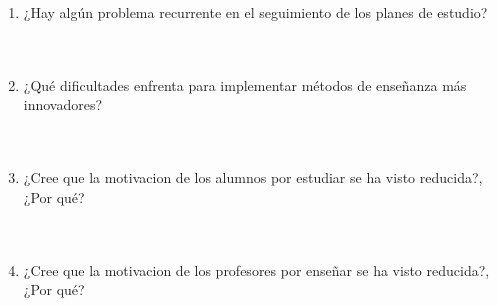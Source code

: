 \documentclass{article}
\begin{document}
\begin{enumerate}
        \underline{\hspace{0.95\linewidth}} \vspace{0.3cm} \\
        \underline{\hspace{0.95\linewidth}} \vspace{0.3cm}
    \item ¿Hay algún problema recurrente en el seguimiento de los planes de estudio? \\[0.5cm]
        \underline{\hspace{0.95\linewidth}} \vspace{0.3cm} \\
        \underline{\hspace{0.95\linewidth}} \vspace{0.3cm} \\
        \underline{\hspace{0.95\linewidth}} \vspace{0.3cm}
    \item ¿Qué dificultades enfrenta para implementar métodos de enseñanza más innovadores? \\[0.5cm]
        \underline{\hspace{0.95\linewidth}} \vspace{0.3cm} \\
        \underline{\hspace{0.95\linewidth}} \vspace{0.3cm} \\
        \underline{\hspace{0.95\linewidth}} \vspace{0.3cm}
    \item ¿Cree que la motivacion de los alumnos por estudiar se ha visto reducida?, ¿Por qué?\\[0.5cm]
        \underline{\hspace{0.95\linewidth}} \vspace{0.3cm} \\
        \underline{\hspace{0.95\linewidth}} \vspace{0.3cm} \\
        \underline{\hspace{0.95\linewidth}} \vspace{0.3cm}
    \item ¿Cree que la motivacion de los profesores por enseñar se ha visto reducida?, ¿Por qué?\\[0.5cm]
        \underline{\hspace{0.95\linewidth}} \vspace{0.3cm} \\

\end{enumerate}
\end{document}
